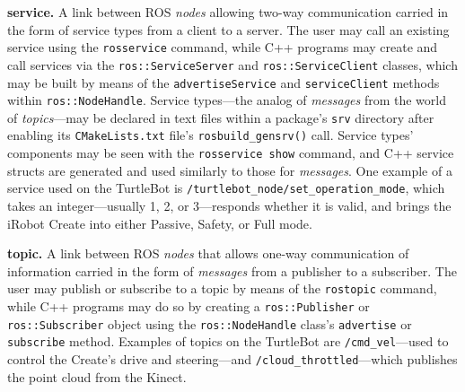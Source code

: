 \documentclass[12pt]{report}
\begin{document}
\begin{itemize}
\begin{sloppypar}
\item{\textbf{service.} A link between ROS \textit{nodes} allowing two-way communication carried in the form of service types from a client to a server.  The user may call an existing service using the \texttt{rosservice} command, while C++ programs may create and call services via the \texttt{ros::ServiceServer} and \texttt{ros::ServiceClient} classes, which may be built by means of the \texttt{advertiseService} and \texttt{serviceClient} methods within \texttt{ros::NodeHandle}.  Service types---the analog of \textit{messages} from the world of \textit{topics}---may be declared in text files within a package's \texttt{srv} directory after enabling its \texttt{CMakeLists.txt} file's \texttt{rosbuild\_gensrv()} call.  Service types' components may be seen with the \texttt{rosservice show} command, and C++ service structs are generated and used similarly to those for \textit{messages}.  One example of a service used on the TurtleBot is \texttt{/turtlebot\_node/set\_operation\_mode}, which takes an integer---usually 1, 2, or 3---responds whether it is valid, and brings the iRobot Create into either Passive, Safety, or Full mode.}
\end{sloppypar}
\item{\textbf{topic.} A link between ROS \textit{nodes} that allows one-way communication of information carried in the form of \textit{messages} from a publisher to a subscriber.  The user may publish or subscribe to a topic by means of the \texttt{rostopic} command, while C++ programs may do so by creating a \texttt{ros::Publisher} or \texttt{ros::Subscriber} object using the \texttt{ros::NodeHandle} class's \texttt{advertise} or \texttt{subscribe} method.  Examples of topics on the TurtleBot are \texttt{/cmd\_vel}---used to control the Create's drive and steering---and \texttt{/cloud\_throttled}---which publishes the point cloud from the Kinect.}
\end{itemize}
\end{document}
